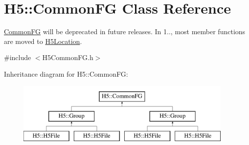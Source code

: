 \hypertarget{class_h5_1_1_common_f_g}{}\section{H5\+:\+:Common\+FG Class Reference}
\label{class_h5_1_1_common_f_g}


\hyperlink{class_h5_1_1_common_f_g}{Common\+FG} will be deprecated in future releases. In 1.., most member functions are moved to \hyperlink{class_h5_1_1_h5_location}{H5\+Location}.  




{\ttfamily \#include $<$H5\+Common\+F\+G.\+h$>$}

Inheritance diagram for H5\+:\+:Common\+FG\+:\begin{figure}[H]
\begin{center}
\leavevmode
\includegraphics[height=3.000000cm]{class_h5_1_1_common_f_g}
\end{center}
\end{figure}
